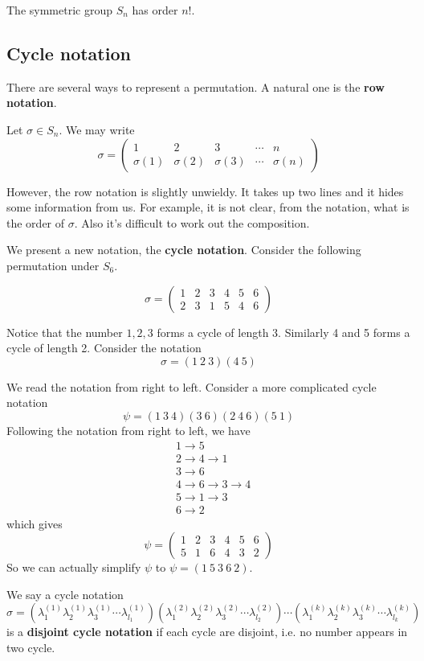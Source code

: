 \documentclass[12pt]{article}
\begin{document}
	\begin{remark}
		The symmetric group $S_n$ has order $n!$.
	\end{remark}

\subsection{Cycle notation}
	There are several ways to represent a permutation. A natural one is the \textbf{row notation}.

	Let $\sigma\in S_n$. We may write
	$$\sigma=
	\begin{pmatrix}
	1&2&3&\cdots&n\\
	\sigma(1)&\sigma(2)&\sigma(3)&\cdots&\sigma(n)
	\end{pmatrix}
	$$

	However, the row notation is slightly unwieldy. It takes up two lines and it hides some information from us. For example, it is not clear, from the notation, what is the order of $\sigma$. Also it's difficult to work out the composition.

	We present a new notation, the \textbf{cycle notation}. Consider the following permutation under $S_6$.

	$$
	\sigma=
	\begin{pmatrix}
	1&2&3&4&5&6\\
	2&3&1&5&4&6
	\end{pmatrix}
	$$

	Notice that the number $1,2,3$ forms a cycle of length 3. Similarly 4 and 5 forms a cycle of length 2. Consider the notation
	$$\sigma = (1\ 2\ 3)(4\ 5)$$

	We read the notation from right to left. Consider a more complicated cycle notation
	$$\psi = (1\ 3\ 4)(3\ 6)(2\ 4\ 6)(5\ 1)$$
	Following the notation from right to left, we have
	\begin{align*}
	&1\to 5\\
	&2\to 4\to 1\\
	&3\to 6\\
	&4\to 6\to 3\to 4\\
	&5\to 1\to 3\\
	&6\to 2
	\end{align*}
	which gives
	$$
	\psi=
	\begin{pmatrix}
	1&2&3&4&5&6\\
	5&1&6&4&3&2
	\end{pmatrix}
	$$
	So we can actually simplify $\psi$ to $\psi = (1\ 5\ 3\ 6\ 2)$.

	We say a cycle notation $\sigma = (\lambda_1^{(1)} \lambda_2^{(1)} \lambda_3^{(1)}\cdots \lambda_{l_1}^{(1)})(\lambda_1^{(2)} \lambda_2^{(2)} \lambda_3^{(2)}\cdots \lambda_{l_2}^{(2)})\cdots(\lambda_1^{(k)} \lambda_2^{(k)} \lambda_3^{(k)}\cdots \lambda_{l_k}^{(k)})$ is a \textbf{disjoint cycle notation} if each cycle are disjoint, i.e. no number appears in two cycle.
\end{document}
